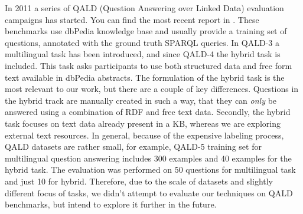 
In 2011 a series of QALD (Question Answering over Linked Data) evaluation campaigns has started.
You can find the most recent report in \cite{UngerFLNCCW15}.
These benchmarks use dbPedia knowledge base and usually provide a training set of questions, annotated with the ground truth SPARQL queries.
In QALD-3 a multilingual task has been introduced, and since QALD-4 the hybrid task is included.
This task asks participants to use both structured data and free form text available in dbPedia abstracts.
The formulation of the hybrid task is the most relevant to our work, but there are a couple of key differences.
Questions in the hybrid track are manually created in such a way, that they can \textit{only} be answered using a combination of RDF and free text data.
Secondly, the hybrid task focuses on text data already present in a KB, whereas we are exploring external text resources.
In general, because of the expensive labeling process, QALD datasets are rather small, for example, QALD-5 training set for multilingual question answering includes 300 examples and 40 examples for the hybrid task.
The evaluation was performed on 50 questions for multilingual task and just 10 for hybrid.
Therefore, due to the scale of datasets and slightly different focus of tasks, we didn't attempt to evaluate our techniques on QALD benchmarks, but intend to explore it further in the future.

